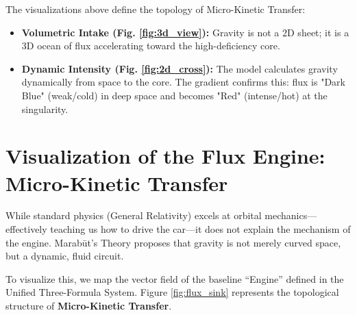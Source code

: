 \documentclass[11pt, a4paper]{article}
\begin{document}
The visualizations above define the topology of Micro-Kinetic Transfer:
\begin{itemize}
  \item \textbf{Volumetric Intake (Fig. \ref{fig:3d_view}):} Gravity is not a 2D sheet; it is a 3D ocean of flux accelerating toward the high-deficiency core.
  \item \textbf{Dynamic Intensity (Fig. \ref{fig:2d_cross}):} The model calculates gravity dynamically from space to the core. The gradient confirms this: flux is "Dark Blue" (weak/cold) in deep space and becomes "Red" (intense/hot) at the singularity.
\end{itemize}

\clearpage
\section{Visualization of the Flux Engine: Micro-Kinetic Transfer}

While standard physics (General Relativity) excels at orbital mechanics—effectively teaching us how to drive the car—it does not explain the mechanism of the engine. Marab\={u}t's Theory proposes that gravity is not merely curved space, but a dynamic, fluid circuit.

To visualize this, we map the vector field of the baseline ``Engine'' defined in the Unified Three-Formula System. Figure \ref{fig:flux_sink} represents the topological structure of \textbf{Micro-Kinetic Transfer}.
\end{document}
